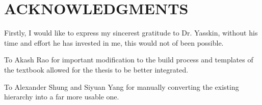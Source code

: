 %
%
%
%


\chapter*{ACKNOWLEDGMENTS}

Firstly, I would like to express my sincerest gratitude to Dr. Yasskin, without his time and effort he has invested in me, this would not of been possible.

To Akash Rao for important modification to the build process and templates of the textbook allowed for the thesis to be better integrated.

To Alexander Shung and Siyuan Yang for manually converting the existing hierarchy into a far more usable one.

\pagebreak{}
